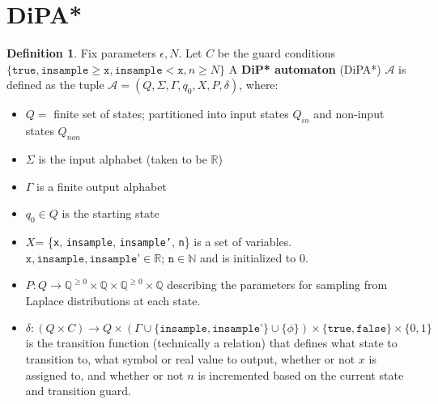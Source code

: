 \documentclass[12pt]{article}
\newcommand{\NN}{\mathbb{N}}
\newcommand{\QQ}{\mathbb{Q}}
\newcommand{\RR}{\mathbb{R}}
\theoremstyle{definition}
\newtheorem{defn}[thm]{Definition}
\begin{document}
\section{DiPA*}

\begin{defn} Fix parameters $\epsilon, N$. Let $C$ be the guard conditions $\{\texttt{true}, \texttt{insample}\geq \texttt{x}, \texttt{insample} < \texttt{x}, n \geq N\}$ A \textbf{DiP* automaton} (DiPA*) $\mathcal{A}$ is defined as the tuple $\mathcal{A} = (Q, \Sigma, \Gamma, q_0, X, P, \delta)$, where:
\begin{itemize}
	\item $Q = $ finite set of states; partitioned into input states $Q_{in}$ and non-input states $Q_{non}$
	\item $\Sigma$ is the input alphabet (taken to be $\RR$)
	\item $\Gamma$ is a finite output alphabet
	\item $q_0\in Q$ is the starting state
	\item $X$= \{\texttt{x}, \texttt{insample}, \texttt{insample'}, \texttt{n}\} is a set of variables. $\texttt{x}, \texttt{insample}, \texttt{insample'} \in \RR$; $\texttt{n} \in \NN$ and is initialized to 0.
	\item $P: Q \to \QQ^{\geq 0} \times \QQ \times \QQ^{\geq 0} \times \QQ$ describing the parameters for sampling from Laplace distributions at each state.
	\item $\delta: (Q \times C) \to Q\times (\Gamma \cup \{\texttt{insample}, \texttt{insample'}\}\cup \{\phi\}) \times \{\texttt{true}, \texttt{false}\} \times \{0, 1\}$ is the transition function (technically a relation) that defines what state to transition to, what symbol or real value to output, whether or not $x$ is assigned to, and whether or not $n$ is incremented based on the current state and transition guard.
\end{itemize}
\end{defn}
\end{document}
